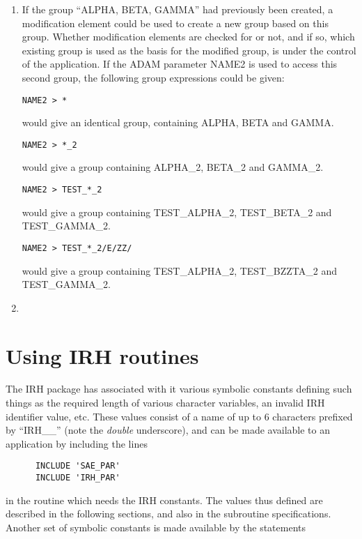\begin{enumerate}
\item
If the group ``ALPHA, BETA, GAMMA'' had previously been created, a modification
element could be used to create a new group based on this group. Whether
modification elements are checked for or not, and if so, which existing group is
used as the basis for the modified group, is under the control of the
application. If the ADAM parameter NAME2 is used to access this second group,
the following group expressions could be given: 

\begin{verbatim}
NAME2 > *
\end{verbatim}
would give an identical group, containing ALPHA, BETA and GAMMA.

\begin{verbatim}
NAME2 > *_2
\end{verbatim}
would give a group containing ALPHA\_2, BETA\_2 and GAMMA\_2.

\begin{verbatim}
NAME2 > TEST_*_2
\end{verbatim}
would give a group containing TEST\_ALPHA\_2, TEST\_BETA\_2 and TEST\_GAMMA\_2.

\begin{verbatim}
NAME2 > TEST_*_2/E/ZZ/
\end{verbatim}
would give a group containing TEST\_ALPHA\_2, TEST\_BZZTA\_2 and TEST\_GAMMA\_2.

\item
\end{enumerate}

\section{Using IRH routines}
The IRH package has associated with it various symbolic constants defining such 
things as the required length of various character variables, an invalid IRH 
identifier value, etc. These values consist of a name of up to 6 characters 
prefixed by ``IRH\_\_''  (note the {\em double} underscore), and can be made 
available to an application by including the lines

\begin{verbatim}
      INCLUDE 'SAE_PAR'
      INCLUDE 'IRH_PAR'
\end{verbatim}

in the routine which needs the IRH constants. The values thus defined are 
described in the following sections, and also in the subroutine specifications. 
Another set of symbolic constants is made available by the statements


